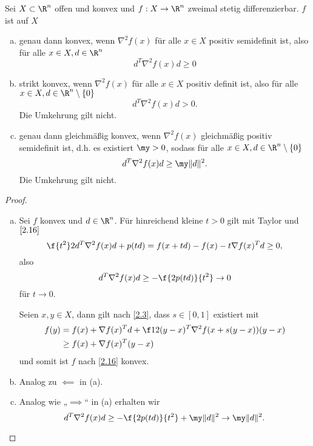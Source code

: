 \begin{st} \label{2.17}
	Sei $X \subset \R^n$ offen und konvex und $f: X \to \R^n$ zweimal stetig differenzierbar.
	$f$ ist auf $X$
	\begin{enumerate}[(a)]
		\item
			genau dann konvex, wenn $\nabla^2 f(x)$ für alle $x \in X$ positiv semidefinit ist, also für alle $x \in X, d \in \R^n$
			\[
				d^T \nabla^2 f(x) d \ge 0
			\]
		\item
			strikt konvex, wenn $\nabla^2 f(x)$ für alle $x \in X$ positiv definit ist, also für alle $x \in X, d \in \R^n \setminus \{0\}$
			\[
				d^T \nabla^2 f(x) d > 0.
			\]
			Die Umkehrung gilt nicht.
		\item
			genau dann gleichmäßig konvex, wenn $\nabla^2 f(x)$ gleichmäßig positiv semidefinit ist, d.h. es existiert $\my > 0$, sodass für alle $x \in X, d \in \R^n \setminus \{0\}$
			\[
				d^T \nabla^2 f(x) d \ge \my \|d\|^2.
			\]
			Die Umkehrung gilt nicht.
	\end{enumerate}
	\begin{proof}
		\begin{enumerate}[(a)]
			\item
				\begin{segnb}[„$\implies$“]
					Sei $f$ konvex und $d \in \R^n$.
					Für hinreichend kleine $t > 0$ gilt mit Taylor und $\ref{2.16}$
					\[
						\f {t^2}2 d^T \nabla^2 f(x) d + p(td)
						= f(x+td) - f(x) - t \nabla f(x)^T d
						\ge 0,
					\]
					also
					\[
						d^T \nabla^2 f(x) d
						\ge - \f {2 p(td)}{t^2} \to 0
					\]
					für $t \to 0$.
				\end{segnb}
				\begin{segnb}[„$\impliedby$“]
					Seien $x,y \in X$, dann gilt nach \ref{2.3}, dass $s \in [0,1]$ existiert mit
					\begin{align*}
						f(y)
						&= f(x) + \nabla f(x)^T d  + \f 12 (y-x)^T \nabla^2 f(x+s(y-x))(y-x) \\
						&\ge f(x) + \nabla f(x)^T (y-x)
					\end{align*}
					und somit ist $f$ nach \ref{2.16} konvex.
				\end{segnb}
			\item
				Analog zu $\impliedby$ in (a).
			\item
				\begin{segnb}[„$\implies$“]
					Analog wie „$\implies$“ in (a) erhalten wir
					\[
						d^T \nabla^2 f(x) d
						\ge - \f {2 p(td)}{t^2} + \my \|d\|^2
						\to \my \|d\|^2.
					\]
				\end{segnb}

\end{enumerate}
\end{proof}
\end{st}
